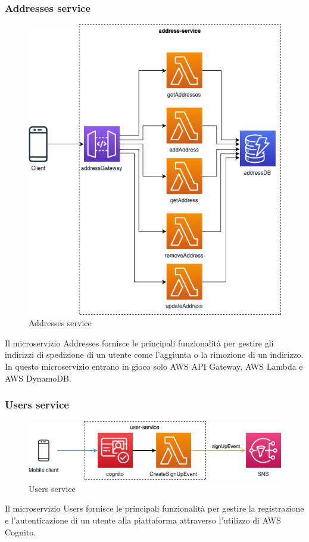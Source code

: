 \subsubsection{Addresses service}
\begin{figure}[H]
	\centering
	\includegraphics[scale=0.4]{Immagini/Backend/AWSAddresses.png}
	\caption{Addresses service}
	\label{fig:Adresses}
\end{figure}
Il microservizio Addresses fornisce le principali funzionalità per gestire gli indirizzi di spedizione di un utente come l'aggiunta o la rimozione di un indirizzo. In questo microservizio entrano in gioco solo AWS API Gateway, AWS Lambda e AWS DynamoDB.

\subsubsection{Users service}
\begin{figure}[H]
	\centering
	\includegraphics[scale=0.7]{Immagini/Backend/AWSUserService.png}
	\caption{Users service}
	\label{fig:Users}
\end{figure} 
Il microservizio Users fornisce le principali funzionalità per gestire la registrazione e l'autenticazione di un utente alla piattaforma attraverso l'utilizzo di AWS Cognito.

